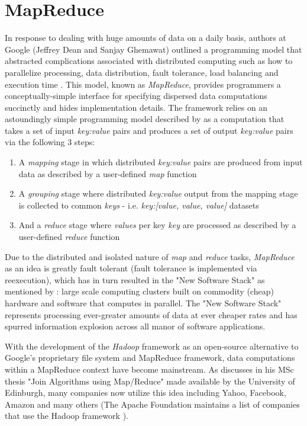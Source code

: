 \section{MapReduce}
In response to dealing with huge amounts of data on a daily basis, authors at Google (Jeffrey Dean and Sanjay Ghemawat) outlined a programming model that abstracted complications associated with distributed computing such as how to parallelize processing, data distribution, fault tolerance, load balancing and execution time \cite{Dean:2008}. This model, known as \textit{MapReduce}, provides programmers a conceptually-simple interface for specifying dispersed data computations succinctly and hides implementation details. The framework relies on an astoundingly simple programming model described by \cite{Dean:2008} as a computation that takes a set of input \textit{key:value} pairs and produces a set of output \textit{key:value} pairs via the following 3 steps:

\begin{enumerate}
    \item A \textit{mapping} stage in which distributed \textit{key:value} pairs are produced from input data as described by a user-defined \textit{map} function
    \item A \textit{grouping} stage where distributed \textit{key:value} output from the mapping stage is collected to common \textit{keys} - i.e. \textit{key:[value, value, value]} datasets
    \item And a \textit{reduce} stage where \textit{values} per key \textit{key} are processed as described by a user-defined \textit{reduce} function
\end{enumerate}

Due to the distributed and isolated nature of \textit{map} and \textit{reduce} tasks, \textit{MapReduce} as an idea is greatly fault tolerant (fault tolerance is implemented via reexecution), which has in turn resulted in the "New Software Stack" as mentioned by \cite{mining2011}: large scale computing clusters built on commodity (cheap) hardware and software that computes in parallel. The "New Software Stack" represents processing ever-greater amounts of data at ever cheaper rates and has spurred information explosion across all manor of software applications.

With the development of the \textit{Hadoop} framework as an open-source alternative to Google's proprietary file system and MapReduce framework, data computations within a MapReduce context have become mainstream. As \cite{chandar2010} discusses in his MSc thesis "Join Algorithms using Map/Reduce" made available by the University of Edinburgh, many companies now utilize this idea including Yahoo, Facebook, Amazon and many others (The Apache Foundation maintains a list of companies that use the Hadoop framework \cite{hadoopPower:2017}).

